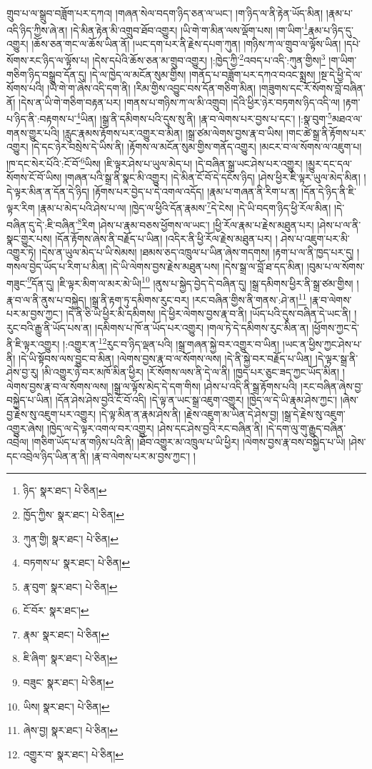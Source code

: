 གྲུབ་པ་ལ་སྒྲུབ་བཟློག་པར་དཀའ། །གཞན་སེལ་བདག་ཉིད་ཅན་ལ་ཡང་། །ག་ཉིད་ལ་ནི་རྟེན་ཡོད་མིན། །རྣམ་པ་འདི་ཉིད་ཀྱིས་ཞེ་ན། །དེ་མིན་རྟེན་མི་འགྲུབ་ཐོབ་འགྱུར། །ཡི་གེ་ག་མིན་ལས་ལྡོག་པས། །ག་ཡིག་\footnote{ཉིད་  སྣར་ཐང་།  པེ་ཅིན། }རྣམ་པ་ཉིད་དུ་འགྱུར། །ཆོས་ཅན་གང་ལ་ཆོས་ཡིན་ནོ། །ཡང་དག་པར་ནི་རྗེས་དཔག་ཀུན། །གཉིས་ཀ་ལ་གྲུབ་ལ་ལྟོས་ཡིན། །དཔེ་སོགས་རང་ཉིད་ལ་ལྟོས་པ། །དེས་དཔེའི་ཆོས་ཅན་མ་གྲུབ་འགྱུར། །:ཁྱེད་ཀྱི་\footnote{ཁྱོད་ཀྱིས་  སྣར་ཐང་།  པེ་ཅིན། }འབད་པ་འདི་:ཀུན་གྱིས།\footnote{ཀུན་གྱི།  སྣར་ཐང་།  པེ་ཅིན། } །ག་ཡིག་གཅིག་ཉིད་བསྒྲུབ་དོན་དུ། །དེ་ལ་ཁྱེད་ལ་མངོན་སུམ་གྱིས། །གནོད་པ་བཟློག་པར་དཀའ་བའང་སྨྲས། །སྔ་དེ་ཕྱི་དེ་ལ་སོགས་པའི། །ཡི་གེ་ག་ཞེས་འདི་དག་ནི། །རིམ་གྱིས་འབྱུང་བས་དོན་གཅིག་མིན། །གཟུགས་དང་རོ་སོགས་བློ་བཞིན་ནོ། །དེས་ན་ཡི་གེ་གཅིག་བརྟན་པར། །གནས་པ་གཉིས་ཀ་ལ་མི་འགྲུབ། །དེའི་ཕྱིར་ཉེར་བཏགས་ཉིད་འདི་ལ། །རྟག་པ་ཉིད་ནི་:བརྟགས་པ་\footnote{བཏགས་པ་  སྣར་ཐང་།  པེ་ཅིན། }ཡིན། །སྒྲ་ནི་དམིགས་པའི་དུས་སུ་ནི། །རྣ་བ་ལེགས་པར་བྱས་པ་དང་། །:སྣ་བུག་\footnote{རྣ་བུག་  སྣར་ཐང་།  པེ་ཅིན། }མཐའ་ལ་གནས་གྱུར་པའི། །རླུང་རྣམས་རྟོགས་པར་འགྱུར་བ་མིན། །སྒྲ་ཙམ་ལེགས་བྱས་རྣ་བ་ཡིས། །གང་ཚེ་སྒྲ་ནི་རྟོགས་པར་འགྱུར། །དེ་དང་ཉེར་བསྲེས་དེ་ཡིས་ནི། །རྟོགས་ལ་མངོན་སུམ་གྱིས་གནོད་འགྱུར། །མངར་བ་ལ་སོགས་ལ་འཇུག་པ། །ཁ་དང་སེར་པོའི་:ངོ་བོ་\footnote{ངོ་བོར་  སྣར་ཐང་། }ཡིས། །ཇི་ལྟར་ཤེས་པ་ཡུལ་མེད་པ། །དེ་བཞིན་སྒྲ་ཡང་ཤེས་པར་འགྱུར། །མྱུར་དང་དལ་སོགས་ངོ་བོ་ཡིས། །གཞན་པའི་སྒྲ་ནི་སྣང་མི་འགྱུར། །དེ་མིན་ངོ་བོ་དེ་དངོས་ཉིད། །ཤེས་ཕྱིར་ཇི་ལྟར་ཡུལ་མེད་མིན། །དེ་ལྟར་མིན་ན་དོན་དེ་ཉིད། །རྟོགས་པར་བྱེད་པ་དེ་འགལ་འདོད། །རྣམ་པ་གཞན་ནི་རིག་པ་ན། །དོན་དེ་ཉིད་ནི་ཇི་ལྟར་རིག །རྣམ་པ་མེད་པའི་ཤེས་པ་ལ། །ཁྱེད་ལ་ཕྱིའི་དོན་རྣམས་\footnote{རྣམ་  སྣར་ཐང་།  པེ་ཅིན། }དེ་ངེས། །དེ་ཡི་བདག་ཉིད་ཕྱི་རོལ་མིན། །དེ་བཞིན་དུ་དེ་:ཇི་བཞིན་\footnote{ཇི་ཞིག་  སྣར་ཐང་།  པེ་ཅིན། }རིག །ཤེས་པ་རྣམ་བཅས་ཕྱོགས་ལ་ཡང་། །ཕྱི་རོལ་རྣམ་པ་རྗེས་མཐུན་པར། །ཤེས་པ་ལ་ནི་སྣང་གྱུར་པས། །དོན་རྟོགས་ཞེས་ནི་བརྗོད་པ་ཡིན། །འདིར་ནི་ཕྱི་རོལ་རྗེས་མཐུན་པར། །
ཤེས་པ་འཇུག་པར་མི་འགྱུར་ཏེ། །དེས་ན་ཡུལ་མེད་པ་ཡི་སེམས། །ཐམས་ཅད་འཁྲུལ་པ་ཡིན་ཞེས་གདགས། །རྟག་པ་ལ་ནི་ཁྱད་པར་དུ། །གསལ་བྱེད་ཡོད་པ་རིག་པ་མིན། །དེ་ཡི་ལེགས་བྱས་རྗེས་མཐུན་པས། །དེས་སྒྲ་ལ་བློ་ཐ་དད་མིན། །བུམ་པ་ལ་སོགས་གཟུང་\footnote{བཟུང་  སྣར་ཐང་།  པེ་ཅིན། }དོན་དུ། །ཇི་ལྟར་མིག་ལ་མར་མེ་ཡི།\footnote{ཡིས།  སྣར་ཐང་།  པེ་ཅིན། } །ནུས་པ་སྐྱེད་བྱེད་དེ་བཞིན་དུ། །སྒྲ་དམིགས་ཕྱིར་ནི་སྒྲ་ཙམ་གྱིས། །རྣ་བ་ལ་ནི་ནུས་པ་བསྐྱེད། །སྒྲ་ནི་རྟག་ཏུ་དམིགས་རུང་བར། །རང་བཞིན་གྱིས་ནི་གནས་:ཤེ་ན།\footnote{ཞེས་བྱ།  སྣར་ཐང་།  པེ་ཅིན། } །རྣ་བ་ལེགས་པར་མ་བྱས་ཀྱང་། །དེ་ནི་ཅི་ཡི་ཕྱིར་མི་དམིགས། །དེ་ཕྱིར་ལེགས་བྱས་རྣ་བ་ནི། །ཡོད་པའི་དུས་བཞིན་དེ་ཡང་ནི། །རུང་བའི་རྒྱུ་ནི་ཡོད་པས་ན། །དམིགས་པ་ཁོ་ན་ཡོད་པར་འགྱུར། །གལ་ཏེ་དེ་དམིགས་རུང་མིན་ན། །ཕྱོགས་ཀྱང་དེ་ནི་ཇི་ལྟར་འགྱུར། །:འགྱུར་ན་\footnote{འགྱུར་བ་  སྣར་ཐང་།  པེ་ཅིན། }རུང་བ་ཉིད་ལྡན་པའི། །སྒྲ་གཞན་སྐྱེ་བར་འགྱུར་བ་ཡིན། །ཡང་ན་ཕྱིས་ཀྱང་ཤེས་པ་ནི། །དེ་ཡི་སྟོབས་ལས་བྱུང་བ་མིན། །ལེགས་བྱས་རྣ་བ་ལ་སོགས་ལས། །དེ་ནི་སྐྱེ་བར་བརྗོད་པ་ཡིན། །དེ་ལྟར་སྒྲ་ནི་ཤེས་བྱ་རུ། །མི་འགྱུར་ཉེ་བར་མཁོ་མིན་ཕྱིར། །རོ་སོགས་ལས་ནི་དེ་ལ་ནི། །ཁྱད་པར་ཅུང་ཟད་ཀྱང་ཡོད་མིན། །ལེགས་བྱས་རྣ་བ་ལ་སོགས་ལས། །སྒྲ་ལ་ལྟོས་མེད་དེ་དག་གིས། །ཤེས་པ་འདི་ནི་སྒྲ་རྟོགས་པའི། །རང་བཞིན་ཞེས་བྱ་བསྐྱེད་པ་ཡིན། །དོན་ཤེས་ཤེས་བྱའི་ངོ་བོ་འདི། །དེ་ལྟ་ན་ཡང་སྒྲ་འཇུག་འགྱུར། །ཁྱེད་ལ་དེ་ཡི་རྣམ་ཤེས་ཀྱང་། །ཞེས་བྱ་རྗེས་སུ་འཇུག་པར་འགྱུར། །དེ་ལྟ་མིན་ན་རྣམ་ཤེས་ནི། །རྗེས་འཇུག་མ་ཡིན་དེ་ཤེས་བྱ། །སྒྲ་དེ་རྗེས་སུ་འཇུག་འགྱུར་ཞེས། །ཁྱེད་ལ་དེ་ལྟར་འགལ་བར་འགྱུར། །ཤེས་དང་ཤེས་བྱའི་རང་བཞིན་ནི། །དེ་དག་ལུ་གུ་རྒྱུད་བཞིན་འབྲེལ། །གཅིག་ཡོད་པ་ན་གཉིས་པའི་ནི། །ཐོབ་འགྱུར་མ་འཁྲུལ་པ་ཡི་ཕྱིར། །ལེགས་བྱས་རྣ་བས་བསྐྱེད་པ་ཡི། །ཤེས་དང་འབྲེལ་ཉིད་ཡིན་ན་ནི། །རྣ་བ་ལེགས་པར་མ་བྱས་ཀྱང་། །
